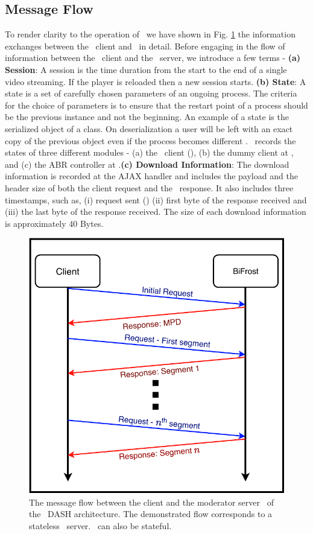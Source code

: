 \subsection{Message Flow}
\indent To render clarity to the operation of \bel\ we have shown in Fig. \ref{fig:chap05:info_xchang} the information exchanges between the \bel\ client and \servname\ in detail. Before engaging in the flow of information between the \bel\ client and the \servname\ server, we introduce a few terms - \textbf{(a) Session}: A session is the time duration from the start to the end of a single video streaming. If the player is reloaded then a new session starts. \textbf{(b) State}: A state is a set of carefully chosen parameters of an ongoing process. The criteria for the choice of parameters is to ensure that the restart point of a process should be the previous instance and not the beginning. An example of a state is the serialized object of a class. On deserialization a user will be left with an exact copy of the previous object even if the process becomes different . \bel\ records the states of three different modules - (a) the \bel\ client (), (b) the dummy client at \servname, and (c) the ABR controller at \servname.\textbf{(c)  Download Information}: The download information is recorded at the AJAX handler and includes the payload and the header size of both the client request and the \servname\ response. It also includes three timestamps, such as, (i) request sent () (ii) first byte of the response received and (iii) the last byte of the response received. The size of each download information is approximately 40 Bytes.\\
\begin{figure}[h]
    \centering
    \includegraphics[width = 0.8\linewidth]{./images/splitDASHTransaction.pdf}
    \caption{The message flow between the client and the moderator server \servname\ of the \bel\ \acs{DASH} architecture. The demonstrated flow corresponds to a stateless \servname\ server. \servname\ can also be stateful.}
    \label{fig:chap05:info_xchang}
\end{figure}{}

